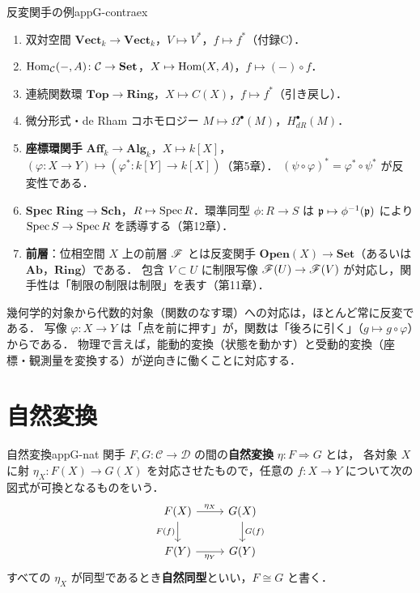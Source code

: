 \begin{myex}{反変関手の例}{appG-contraex}
\begin{enumerate}
\item 双対空間 $\mathbf{Vect}_k\to\mathbf{Vect}_k$，$V\mapsto V^*$，$f\mapsto f^*$（付録C）．
\item $\operatorname{Hom}_{\mathcal C}(-,A)\colon\mathcal C\to\mathbf{Set}$，$X\mapsto\operatorname{Hom}(X,A)$，$f\mapsto(-)\circ f$．
\item 連続関数環 $\mathbf{Top}\to\mathbf{Ring}$，$X\mapsto C(X)$，$f\mapsto f^*$（引き戻し）．
\item 微分形式・de Rham コホモロジー $M\mapsto\Omega^\bullet(M)$，$H^\bullet_{dR}(M)$．
\item \textbf{座標環関手} $\mathbf{Aff}_k\to\mathbf{Alg}_k$，$X\mapsto k[X]$，$(\varphi\colon X\to Y)\mapsto(\varphi^*\colon k[Y]\to k[X])$（第5章）．
$(\psi\circ\varphi)^*=\varphi^*\circ\psi^*$ が反変性である．
\item \textbf{Spec} $\mathbf{Ring}\to\mathbf{Sch}$，$R\mapsto\operatorname{Spec} R$．環準同型 $\phi\colon R\to S$ は $\mathfrak{p}\mapsto\phi^{-1}(\mathfrak{p})$ により $\operatorname{Spec} S\to\operatorname{Spec} R$ を誘導する（第12章）．
\item \textbf{前層}：位相空間 $X$ 上の前層 $\mathscr{F}$ とは反変関手 $\mathbf{Open}(X)\to\mathbf{Set}$（あるいは $\mathbf{Ab}$，$\mathbf{Ring}$）である．
包含 $V\subset U$ に制限写像 $\mathscr{F}(U)\to\mathscr{F}(V)$ が対応し，関手性は「制限の制限は制限」を表す（第11章）．
\end{enumerate}
\end{myex}

\begin{note}
幾何学的対象から代数的対象（関数のなす環）への対応は，ほとんど常に反変である．
写像 $\varphi\colon X\to Y$ は「点を前に押す」が，関数は「後ろに引く」（$g\mapsto g\circ\varphi$）からである．
物理で言えば，能動的変換（状態を動かす）と受動的変換（座標・観測量を変換する）が逆向きに働くことに対応する．
\end{note}

\section{自然変換}

\begin{mydef}{自然変換}{appG-nat}
関手 $F,G\colon\mathcal C\to\mathcal D$ の間の\textbf{自然変換} $\eta\colon F\Rightarrow G$ とは，
各対象 $X$ に射 $\eta_X\colon F(X)\to G(X)$ を対応させたもので，任意の $f\colon X\to Y$ について次の図式が可換となるものをいう．
\[
\begin{tikzcd}
F(X) \arrow[r,"\eta_X"] \arrow[d,"F(f)"'] & G(X) \arrow[d,"G(f)"]\\
F(Y) \arrow[r,"\eta_Y"'] & G(Y)
\end{tikzcd}
\]
すべての $\eta_X$ が同型であるとき\textbf{自然同型}といい，$F\cong G$ と書く．
\end{mydef}

